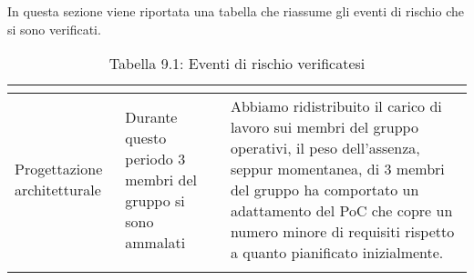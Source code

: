 In questa sezione viene riportata una tabella che riassume gli eventi di rischio che si sono verificati.
\\
\renewcommand{\arraystretch}{1.5}
\begin{longtable}{| m{13em} | m{11em} | m{14em} |}
\hline
\rowcolor{title_row}
\textbf{\color{title_text}{Periodo}}  & \textbf{\color{title_text}{Evento}} & \textbf{\color{title_text}{Reazione}} \\
\endhead
\hline
Progettazione architetturale & Durante questo periodo 3 membri del gruppo si sono ammalati & Abbiamo ridistribuito il carico di lavoro sui membri del gruppo operativi,
il peso dell'assenza, seppur momentanea, di 3 membri del gruppo ha comportato un adattamento del PoC che copre un numero minore di requisiti rispetto a quanto pianificato inizialmente. \\
\hline
\caption{Tabella 9.1: Eventi di rischio verificatesi\label{}}
\end{longtable}
\renewcommand{\arraystretch}{1}
\newpage
